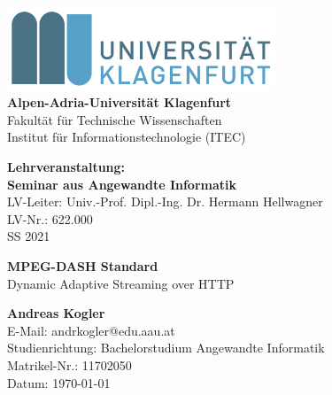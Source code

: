 \documentclass[paper = a4, fontsize = 12pt, parskip = half]{scrartcl} %
\begin{document}

\begin{titlepage}

	\begin{center}
		\includegraphics[width=8cm]{images/logo_aau.png} \\
		\vspace{8mm}
		\huge\textbf{Alpen-Adria-Universität Klagenfurt} \\
		\vspace{3mm}
		Fakultät für Technische Wissenschaften \\
		\vspace{3mm}
		Institut für Informationstechnologie (ITEC)\\
		\vspace{3mm}
	\end{center}

	\vspace{5mm}

	\begin{center}
		\textbf{Lehrveranstaltung: \\
			Seminar aus Angewandte Informatik} \\
		\vspace{2mm}
		LV-Leiter: Univ.-Prof. Dipl.-Ing. Dr. Hermann Hellwagner \\
		LV-Nr.: 622.000 \\
		SS 2021
	\end{center}

	\vspace{15mm}

	\begin{center}
		\Large\textbf{MPEG-DASH Standard} \\
		\vspace{2mm}
		\normalsize Dynamic Adaptive Streaming over HTTP
	\end{center}

	\vspace{40mm}

	\begin{flushleft}
		\textbf{Andreas Kogler} \\
		E-Mail: andrkogler@edu.aau.at \\
		Studienrichtung: Bachelorstudium Angewandte Informatik \\
		Matrikel-Nr.: 11702050\\
		Datum: \today
	\end{flushleft}

\end{titlepage}
\end{document}

